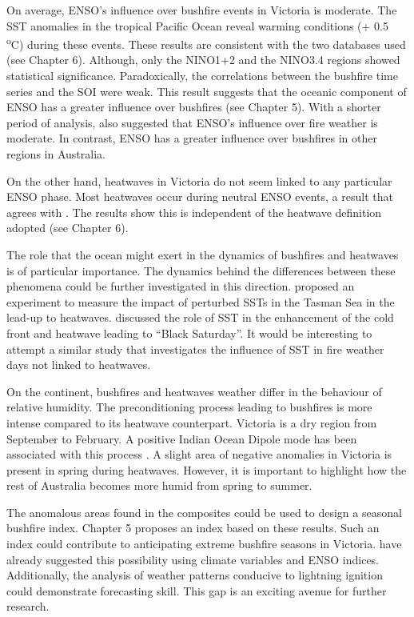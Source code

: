 On average, ENSO's influence over bushfire events in Victoria is moderate.
The SST anomalies in the tropical Pacific Ocean reveal warming conditions
(+ 0.5 \textsuperscript{o}C) during these events. These results are
consistent with the two databases used (see Chapter 6). Although,
only the NINO1+2 and the NINO3.4 regions showed statistical significance.
Paradoxically, the correlations between the bushfire time series and
the SOI were weak. This result suggests that the oceanic component
of ENSO has a greater influence over bushfires (see Chapter 5). With
a shorter period of analysis, \citet{Harris2013} also suggested that
ENSO's influence over fire weather is moderate. In contrast, ENSO
has a greater influence over bushfires in other regions in Australia\citep{Nicholls2007a,Harris2008}. 

On the other hand, heatwaves in Victoria do not seem linked to any
particular ENSO phase. Most heatwaves occur during neutral ENSO events,
a result that agrees with \citet{Boschat2014}. The results show this
is independent of the heatwave definition adopted (see Chapter 6). 

The role that the ocean might exert in the dynamics of bushfires and
heatwaves is of particular importance. The dynamics behind the differences
between these phenomena could be further investigated in this direction.
\citet{Sadler2012} proposed an experiment to measure the impact of
perturbed SSTs in the Tasman Sea in the lead-up to heatwaves. \citet{Fiddes2015}
discussed the role of SST in the enhancement of the cold front and
heatwave leading to ``Black Saturday''. It would be interesting
to attempt a similar study that investigates the influence of SST
in fire weather days not linked to heatwaves. 

On the continent, bushfires and heatwaves weather differ in the behaviour
of relative humidity. The preconditioning process leading to bushfires
is more intense compared to its heatwave counterpart. Victoria is
a dry region from September to February. A positive Indian Ocean Dipole
mode has been associated with this process \citep{Cai2009}. A slight
area of negative anomalies in Victoria is present in spring during
heatwaves. However, it is important to highlight how the rest of Australia
becomes more humid from spring to summer. 

The anomalous areas found in the composites could be used to design
a seasonal bushfire index. Chapter 5 proposes an index based on these
results. Such an index could contribute to anticipating extreme bushfire
seasons in Victoria. \citet{Harris2013} have already suggested this
possibility using climate variables and ENSO indices. Additionally,
the analysis of weather patterns conducive to lightning ignition could
demonstrate forecasting skill. This gap is an exciting avenue for
further research. 

